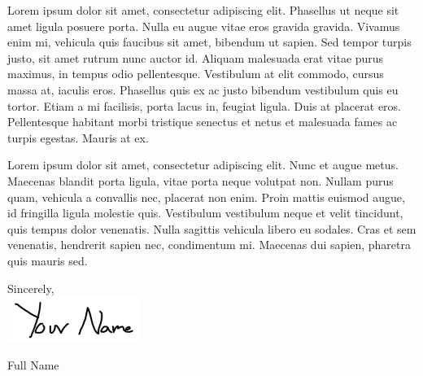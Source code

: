 \documentclass{article}
\begin{document}
\vspace{.5em}

{\Large\noindent Lorem ipsum dolor sit amet, consectetur adipiscing elit. Phasellus ut neque sit amet ligula posuere porta. Nulla eu augue vitae eros gravida gravida. Vivamus enim mi, vehicula quis faucibus sit amet, bibendum ut sapien. Sed tempor turpis justo, sit amet rutrum nunc auctor id. Aliquam malesuada erat vitae purus maximus, in tempus odio pellentesque. Vestibulum at elit commodo, cursus massa at, iaculis eros. Phasellus quis ex ac justo bibendum vestibulum quis eu tortor. Etiam a mi facilisis, porta lacus in, feugiat ligula. Duis at placerat eros. Pellentesque habitant morbi tristique senectus et netus et malesuada fames ac turpis egestas. Mauris at ex.}

\vspace{.5em}

{\Large\noindent Lorem ipsum dolor sit amet, consectetur adipiscing elit. Nunc et augue metus. Maecenas blandit porta ligula, vitae porta neque volutpat non. Nullam purus quam, vehicula a convallis nec, placerat non enim. Proin mattis euismod augue, id fringilla ligula molestie quis. Vestibulum vestibulum neque et velit tincidunt, quis tempus dolor venenatis. Nulla sagittis vehicula libero eu sodales. Cras et sem venenatis, hendrerit sapien nec, condimentum mi. Maecenas dui sapien, pharetra quis mauris sed.}

\vspace{1em}

{\Large\noindent Sincerely,}\vspace{.6em}
\\
\includegraphics[height=4em]{signature.png}

\vspace{.4em}
{\Large\noindent Full Name}
\end{document}

